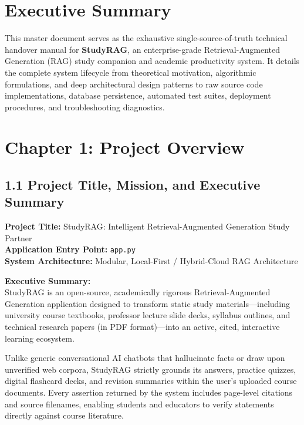 \documentclass[
]{article}
\begin{document}
\newpage
\tableofcontents
\newpage



\section{Executive Summary}\label{executive-summary}

This master document serves as the exhaustive single-source-of-truth
technical handover manual for \textbf{StudyRAG}, an enterprise-grade
Retrieval-Augmented Generation (RAG) study companion and academic
productivity system. It details the complete system lifecycle from
theoretical motivation, algorithmic formulations, and deep architectural
design patterns to raw source code implementations, database
persistence, automated test suites, deployment procedures, and
troubleshooting diagnostics.

\section{Chapter 1: Project Overview}\label{chapter-1-project-overview}

\subsection{1.1 Project Title, Mission, and Executive
Summary}\label{project-title-mission-and-executive-summary}

\textbf{Project Title:} StudyRAG: Intelligent Retrieval-Augmented
Generation Study Partner\\
\textbf{Application Entry Point:} \texttt{app.\allowbreak py}\\
\textbf{System Architecture:} Modular, Local-First / Hybrid-Cloud RAG
Architecture

\textbf{Executive Summary:}\\
StudyRAG is an open-source, academically rigorous Retrieval-Augmented
Generation application designed to transform static study
materials---including university course textbooks, professor lecture
slide decks, syllabus outlines, and technical research papers (in PDF
format)---into an active, cited, interactive learning ecosystem.

Unlike generic conversational AI chatbots that hallucinate facts or draw
upon unverified web corpora, StudyRAG strictly grounds its answers,
practice quizzes, digital flashcard decks, and revision summaries within
the user's uploaded course documents. Every assertion returned by the
system includes page-level citations and source filenames, enabling
students and educators to verify statements directly against course
literature.
\end{document}
